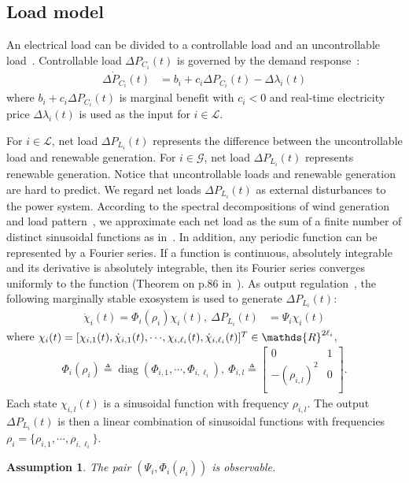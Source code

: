 \documentclass[journal]{IEEEtran}
\newcommand{\lbd}{{\lambda}}
\newcommand{\real}{\mathds{R}}
\newcommand{\GG}{{\mathcal{G}}}
\newcommand{\LL}{{\mathcal{L}}}
\newcommand{\diag}[1]{\operatorname{diag}(#1)}
\newtheorem{assumption}{\bf Assumption}[section]
\begin{document}
\subsection{Load model}
An electrical load can be divided to a controllable load and an uncontrollable load~\cite{alvarado1999stability,Alvarado.Meng.ea:01,chiu2013energy}.
Controllable load $\Delta P_{C_i}(t)$ is governed by the demand response~\cite{Alvarado.Meng.ea:01}:
\begin{align}
\Delta \dot{P}_{C_i}(t) &= b_i + c_i \Delta P_{C_i}(t) - \Delta \lbd_i(t)
\label{e6.04}
\end{align}
where $b_i + c_i \Delta P_{C_i}(t)$ is marginal benefit with $c_i<0$ and real-time electricity price $\Delta \lbd_i(t)$ is used as the input for $i \in \LL$.



For $i\in \LL$, net load $\Delta P_{L_i}(t)$ represents the difference between the uncontrollable load and renewable generation. For $i\in \GG$, net load $\Delta P_{L_i}(t)$ represents renewable generation.
Notice that uncontrollable loads and renewable generation are hard to predict.
We regard net loads $\Delta P_{L_i}(t)$ as external disturbances to the power system.
According to the spectral decompositions of wind generation~\cite{milan2013turbulent,van1957power} and load pattern~\cite{aguirre2008dynamical}, we approximate each net load as the sum of a finite number of distinct sinusoidal functions as in~\cite{trip2016internal}.
In addition, any periodic function can be represented by a Fourier series.
If a function is continuous, absolutely integrable and its derivative is absolutely integrable, then its Fourier series converges uniformly to the function (Theorem on p.86 in~\cite{tolstov2012fourier}).
As output regulation~\cite{francis1975internal,isidori1990output}, the following marginally stable exosystem is used to generate $\Delta P_{L_i}(t)$:
\begin{align}
\dot{\chi}_i(t) = \Phi_i(\rho_i) \chi_i(t), \ \Delta P_{L_i}(t)& = \Psi_i \chi_i(t)
\label{e21}
\end{align}
where $\chi_i(t)= [\chi_{i,1}(t), \dot{\chi}_{i,1}(t), {\small \cdots}, \chi_{i,\ell_i}(t),\dot{\chi}_{i,\ell_i}(t)]^T \in \real^{2\ell_i}$,
\begin{align*}
\Phi_i(\rho_i) \triangleq \diag{\Phi_{i,1}, \cdots, \Phi_{i,\ell_i}}, \ \Phi_{i,l} \triangleq
\left[
\begin{array}{cc}
0&1\\
-(\rho_{i,l})^2&0\\
\end{array}
\right].
\end{align*}
Each state $\chi_{i,l}(t)$ is a sinusoidal function with frequency $\rho_{i,l}$. The output $\Delta P_{L_i}(t)$ is then a linear combination of sinusoidal functions with frequencies $\rho_i=\{\rho_{i,1}, \cdots, \rho_{i,\ell_i}\}$.
\begin{assumption}
The pair $(\Psi_{i},\Phi_i(\rho_i))$ is observable.\label{asmp3}
\end{assumption}
\end{document}
